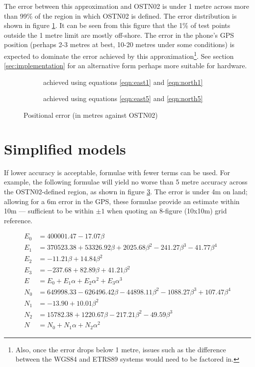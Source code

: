 \documentclass[10pt,a4paper]{article}
\def\tkname#1{}
\def\gap{\hspace{2cm}}
\begin{document}
The error between this approximation and OSTN02 is under 1 metre across more
than 99\% of the region in which OSTN02 is defined.  The error distribution is
shown in figure \ref{fig:one_metre_model}.  It can be seen from this figure
that the 1\% of test points outside the 1 metre limit are mostly off-shore.
The error in the phone's GPS position (perhaps 2-3 metres at best, 10-20 metres
under some conditions) is expected to dominate the error achieved by this
approximation\footnote{Also, once the error drops below 1 metre, issues such as
the difference between the WGS84 and ETRS89 systems would need to be factored
in.}.  See section \ref{sec:implementation} for an alternative form perhaps
more suitable for hardware.

\begin{figure}[htb]
  \begin{subfigure}[b]{0.4\textwidth}
    \tkname{one_metre_model}
  \centering
  \fbox{
    
  }
  \caption{achieved using equations \eqref{eqn:east1} and \eqref{eqn:north1}}
  \label{fig:one_metre_model}
\end{subfigure}
\gap
  \begin{subfigure}[b]{0.4\textwidth}
    \tkname{5_metre_model}
  \centering
  \fbox{
    
  }
  \caption{achieved using equations \eqref{eqn:east5} and \eqref{eqn:north5}}
  \label{fig:5-metre-model}
\end{subfigure}
  \caption{Positional error (in metres against OSTN02)}
\hrulefill
\end{figure}

\section {Simplified models}

If lower accuracy is acceptable, formulae with fewer terms can be used.  For
example, the following formulae will yield no worse than 5 metre accuracy
across the OSTN02-defined region, as shown in figure \ref{fig:5-metre-model}.
The error is under 4m on land; allowing for a 6m error in the GPS, these
formulae provide an estimate within 10m --- sufficient to be within $\pm{}1$
when quoting an 8-figure (10x10m) grid reference.

\begin{align}
E_0 &= 400001.47 -17.07\beta\nonumber \\
E_1 &= 370523.38 +53326.92\beta +2025.68\beta^2 -241.27\beta^3 -41.77\beta^4\nonumber \\
E_2 &= -11.21\beta +14.84\beta^2\nonumber \\
E_3 &= -237.68 +82.89\beta +41.21\beta^2\nonumber \\
E &= E_0 +E_1\alpha +E_2\alpha^2 +E_3\alpha^3
  \label{eqn:east5}
\\[1ex]
N_0 &= 649998.33 -626496.42\beta -44898.11\beta^2 -1088.27\beta^3 +107.47\beta^4\nonumber \\
N_1 &= -13.90 +10.01\beta^2\nonumber \\
N_2 &= 15782.38 +1220.67\beta -217.21\beta^2 -49.59\beta^3\nonumber \\
N &= N_0 +N_1\alpha +N_2\alpha^2
  \label{eqn:north5}
\end{align}
\end{document}
